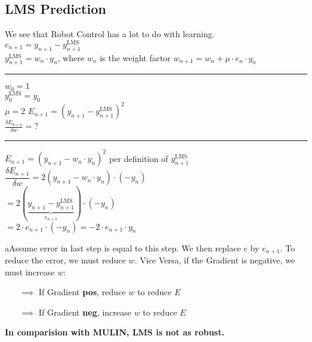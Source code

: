 \documentclass{exerciseBlue}
\begin{document}
\subsection{LMS Prediction}
We see that Robot Control has a lot to do with learning.\\
$e_{n+1} = y_{n+1} - y_{n+1}^{\text{LMS}}$\\
$y_{n+1}^{\text{LMS}} = w_n \cdot y_n$, where $w_n$ is the weight factor
$w_{n+1} = w_n + \mu \cdot e_n\cdot y_n$\\
\noindent\rule{\textwidth}{0.3pt}
$w_0 = 1$\\
$y_0^{\text{LMS}} = y_0$\\
$\mu = 2$
$E_{n+1} = (y_{n+1} - y_{n+1}^{\text{LMS}})^2$\\
$\frac{\delta E_{n+1}}{\delta w} = ?$\\
\noindent\rule{\textwidth}{0.3pt}
$E_{n+1} = (y_{n+1} - w_n\cdot y_n)^2$ per definition of $y_{n+1}^{\text{LMS}}$\\
$\dfrac{\delta E_{n+1}}{\delta w} = 2(y_{n+1}-w_n\cdot y_n)\cdot (-y_n)$\\
$ = 2(\underbrace{y_{n+1}-y_{n+1}^{\text{LMS}}}_{e_{n+1}})\cdot (-y_n)$\\
$ = 2\cdot e_{n+1}\cdot (-y_n) = -2\cdot e_{n+1}\cdot y_n$
\par aAssume error in last step is equal to this step. We then replace $e$ by $e_{n+1}$. To reduce the error, we must reduce $w$. Vice Versa, if the Gradient is negative, we must increase $w$:
\begin{itemize}
	\item[$\implies$] If Gradient \textbf{pos}, reduce $w$ to reduce $E$
	\item[$\implies$] If Gradient \textbf{neg}, increase $w$ to reduce $E$
\end{itemize}
\textbf{In comparision with MULIN, LMS is not as robust.}
 
\end{document}
